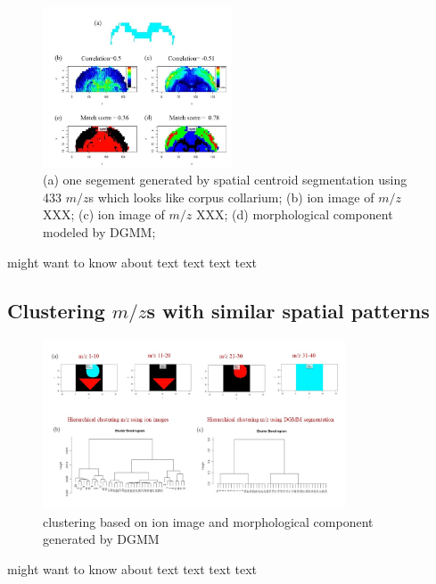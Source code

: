 \documentclass{bioinfo}
\begin{document}
\begin{figure}[b!]
    
	\includegraphics[width=0.5\textwidth]{figure6.jpg}
    \caption{(a) one segement generated by spatial centroid segmentation using 433 $m/z$s which looks like corpus collarium; (b) ion image of $m/z$ XXX; (c) ion image of $m/z$ XXX; (d) morphological component modeled by DGMM; }
    \label{fig:figure6}
\end{figure}
\citealp{Boffelli03} might want to know about text text text
text\vspace*{1pt}


\subsection{Clustering $m/z$s with similar spatial patterns}


\begin{figure}[b!]
    
	\includegraphics[width=0.8\textwidth]{figure7.jpg}
    \caption{clustering based on ion image and morphological component generated by DGMM}
    \label{fig:figure7}
\end{figure}
\citealp{Boffelli03} might want to know about text text text
text\vspace*{1pt}
\end{document}
